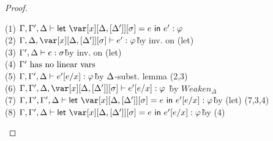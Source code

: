 \InliningTheorem

\begin{proof}~

\begin{tabbing}
    (1) $\G,\G',\D \vdash \llet{\xD = e}{e'} : \vp$\\
    (2) $\G,\D,\xD \vdash e' : \vp$\` by inv. on (let)\\
    (3) $\Gamma',\Delta \vdash e : \sigma$\` by inv. on (let)\\
    (4) $\Gamma' ~\textrm{has no linear vars}$\\
    (5) $\Gamma,\Gamma',\Delta\vdash e'[e/x] : \varphi$\` by $\Delta$-subst. lemma (2,3)\\
    (6) $\G,\G',\D,\xD \vdash e'[e/x] : \vp$ \` by $Weaken_\Delta$\\
    (7) $\G,\G',\G',\D \vdash \llet{\xD = e}{e'[e/x]} : \vp$\` by (let) (7,3,4)\\
    (8) $\G,\G',\D \vdash \llet{\xD = e}{e'[e/x]} : \vp$\` by (4)\\
\end{tabbing}
\end{proof}

